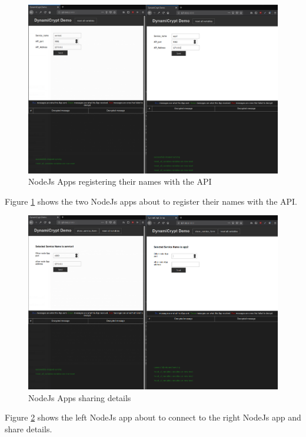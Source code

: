 \begin{figure}[!h]
  \centering
      \includegraphics[width=1\textwidth]{Figures/proto4-final.png}
  \caption[NodeJs Apps registering their names with the API]{NodeJs Apps registering their names with the API}
  \label{fig:proto4-final}
\end{figure}
\FloatBarrier

Figure \ref{fig:proto4-final} shows the two NodeJs apps about to register their names with the API.

\begin{figure}[!h]
  \centering
      \includegraphics[width=1\textwidth]{Figures/proto5-final.png}
  \caption[NodeJs Apps sharing details]{NodeJs Apps sharing details}
  \label{fig:proto5-final}
\end{figure}
\FloatBarrier
Figure \ref{fig:proto5-final} shows the left NodeJs app about to connect to the right NodeJs app and share details.

